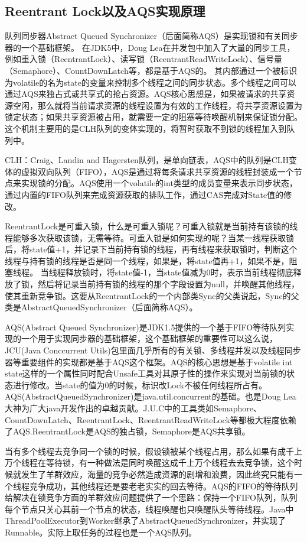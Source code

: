\documentclass[../../../interview-questions.tex]{subfiles}
\begin{document}
\subsection{Reentrant Lock以及AQS实现原理}

队列同步器Abstract Queued Synchronizer（后面简称AQS）是实现锁和有关同步器的一个基础框架。
在JDK5中，Doug Lea在并发包中加入了大量的同步工具，例如重入锁（ReentrantLock）、读写锁（ReentrantReadWriteLock）、信号量（Semaphore）、CountDownLatch等，都是基于AQS的。
其内部通过一个被标识为volatile的名为state的变量来控制多个线程之间的同步状态。多个线程之间可以通过AQS来独占式或共享式的抢占资源。AQS核心思想是，如果被请求的共享资源空闲，那么就将当前请求资源的线程设置为有效的工作线程，将共享资源设置为锁定状态；如果共享资源被占用，就需要一定的阻塞等待唤醒机制来保证锁分配。这个机制主要用的是CLH队列的变体实现的，将暂时获取不到锁的线程加入到队列中。

CLH：Craig、Landin and Hagersten队列，是单向链表，AQS中的队列是CLH变体的虚拟双向队列（FIFO），AQS是通过将每条请求共享资源的线程封装成一个节点来实现锁的分配。AQS使用一个volatile的int类型的成员变量来表示同步状态，通过内置的FIFO队列来完成资源获取的排队工作，通过CAS完成对State值的修改。

ReentrantLock是可重入锁，什么是可重入锁呢？可重入锁就是当前持有该锁的线程能够多次获取该锁，无需等待。可重入锁是如何实现的呢？当某一线程获取锁后，将state值+1，并记录下当前持有锁的线程，再有线程来获取锁时，判断这个线程与持有锁的线程是否是同一个线程，如果是，将state值再+1，如果不是，阻塞线程。
当线程释放锁时，将state值-1，当state值减为0时，表示当前线程彻底释放了锁，然后将记录当前持有锁的线程的那个字段设置为null，并唤醒其他线程，使其重新竞争锁。这要从ReentrantLock的一个内部类Sync的父类说起，Sync的父类是AbstractQueuedSynchronizer（后面简称AQS）。

AQS(Abstract Queued Synchronizer)是JDK1.5提供的一个基于FIFO等待队列实现的一个用于实现同步器的基础框架，这个基础框架的重要性可以这么说，JCU(Java Conccurrent Utils)包里面几乎所有的有关锁、多线程并发以及线程同步器等重要组件的实现都是基于AQS这个框架。AQS的核心思想是基于volatile int state这样的一个属性同时配合Unsafe工具对其原子性的操作来实现对当前锁的状态进行修改。当state的值为0的时候，标识改Lock不被任何线程所占有。AQS(AbstractQueuedSynchronizer)是java.util.concurrent的基础。也是Doug Lea大神为广大java开发作出的卓越贡献。J.U.C中的工具类如Semaphore、CountDownLatch、ReentrantLock、ReentrantReadWriteLock等都极大程度依赖了AQS.ReentrantLock是AQS的独占锁，Semaphore是AQS共享锁。

当有多个线程去竞争同一个锁的时候，假设锁被某个线程占用，那么如果有成千上万个线程在等待锁，有一种做法是同时唤醒这成千上万个线程去去竞争锁，这个时候就发生了羊群效应，海量的竞争必然造成资源的剧增和浪费，因此终究只能有一个线程竞争成功，其他线程还是要老老实实的回去等待。AQS的FIFO的等待队列给解决在锁竞争方面的羊群效应问题提供了一个思路：保持一个FIFO队列，队列每个节点只关心其前一个节点的状态，线程唤醒也只唤醒队头等待线程。Java中ThreadPoolExecutor到Worker继承了AbstractQueuedSynchronizer，并实现了Runnable。实际上取任务的过程也是一个AQS队列。
\end{document}
